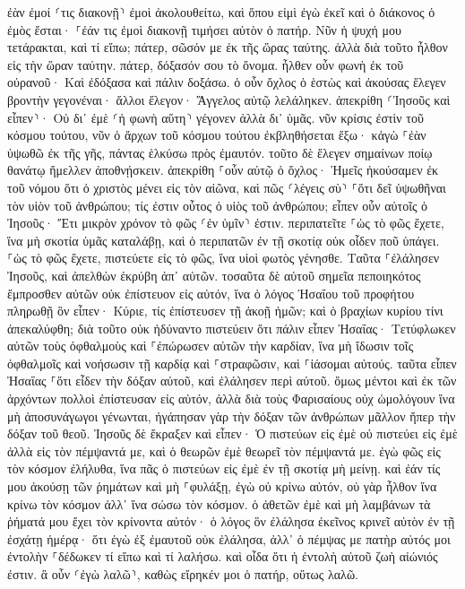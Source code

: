 \documentclass[twoside, 9pt]{extreport}
\begin{document}
ἐὰν ἐμοί ⸂τις διακονῇ⸃ ἐμοὶ ἀκολουθείτω, καὶ ὅπου εἰμὶ ἐγὼ ἐκεῖ καὶ ὁ διάκονος ὁ ἐμὸς ἔσται· ⸀ἐάν τις ἐμοὶ διακονῇ τιμήσει αὐτὸν ὁ πατήρ. 
Νῦν ἡ ψυχή μου τετάρακται, καὶ τί εἴπω; πάτερ, σῶσόν με ἐκ τῆς ὥρας ταύτης. ἀλλὰ διὰ τοῦτο ἦλθον εἰς τὴν ὥραν ταύτην. 
πάτερ, δόξασόν σου τὸ ὄνομα. ἦλθεν οὖν φωνὴ ἐκ τοῦ οὐρανοῦ· Καὶ ἐδόξασα καὶ πάλιν δοξάσω. 
ὁ οὖν ὄχλος ὁ ἑστὼς καὶ ἀκούσας ἔλεγεν βροντὴν γεγονέναι· ἄλλοι ἔλεγον· Ἄγγελος αὐτῷ λελάληκεν. 
ἀπεκρίθη ⸂Ἰησοῦς καὶ εἶπεν⸃· Οὐ δι᾽ ἐμὲ ⸂ἡ φωνὴ αὕτη⸃ γέγονεν ἀλλὰ δι᾽ ὑμᾶς. 
νῦν κρίσις ἐστὶν τοῦ κόσμου τούτου, νῦν ὁ ἄρχων τοῦ κόσμου τούτου ἐκβληθήσεται ἔξω· 
κἀγὼ ⸀ἐὰν ὑψωθῶ ἐκ τῆς γῆς, πάντας ἑλκύσω πρὸς ἐμαυτόν. 
τοῦτο δὲ ἔλεγεν σημαίνων ποίῳ θανάτῳ ἤμελλεν ἀποθνῄσκειν. 
ἀπεκρίθη ⸀οὖν αὐτῷ ὁ ὄχλος· Ἡμεῖς ἠκούσαμεν ἐκ τοῦ νόμου ὅτι ὁ χριστὸς μένει εἰς τὸν αἰῶνα, καὶ πῶς ⸂λέγεις σὺ⸃ ⸀ὅτι δεῖ ὑψωθῆναι τὸν υἱὸν τοῦ ἀνθρώπου; τίς ἐστιν οὗτος ὁ υἱὸς τοῦ ἀνθρώπου; 
εἶπεν οὖν αὐτοῖς ὁ Ἰησοῦς· Ἔτι μικρὸν χρόνον τὸ φῶς ⸂ἐν ὑμῖν⸃ ἐστιν. περιπατεῖτε ⸀ὡς τὸ φῶς ἔχετε, ἵνα μὴ σκοτία ὑμᾶς καταλάβῃ, καὶ ὁ περιπατῶν ἐν τῇ σκοτίᾳ οὐκ οἶδεν ποῦ ὑπάγει. 
⸀ὡς τὸ φῶς ἔχετε, πιστεύετε εἰς τὸ φῶς, ἵνα υἱοὶ φωτὸς γένησθε. Ταῦτα ⸀ἐλάλησεν Ἰησοῦς, καὶ ἀπελθὼν ἐκρύβη ἀπ᾽ αὐτῶν. 
τοσαῦτα δὲ αὐτοῦ σημεῖα πεποιηκότος ἔμπροσθεν αὐτῶν οὐκ ἐπίστευον εἰς αὐτόν, 
ἵνα ὁ λόγος Ἠσαΐου τοῦ προφήτου πληρωθῇ ὃν εἶπεν· Κύριε, τίς ἐπίστευσεν τῇ ἀκοῇ ἡμῶν; καὶ ὁ βραχίων κυρίου τίνι ἀπεκαλύφθη; 
διὰ τοῦτο οὐκ ἠδύναντο πιστεύειν ὅτι πάλιν εἶπεν Ἠσαΐας· 
Τετύφλωκεν αὐτῶν τοὺς ὀφθαλμοὺς καὶ ⸀ἐπώρωσεν αὐτῶν τὴν καρδίαν, ἵνα μὴ ἴδωσιν τοῖς ὀφθαλμοῖς καὶ νοήσωσιν τῇ καρδίᾳ καὶ ⸀στραφῶσιν, καὶ ⸀ἰάσομαι αὐτούς. 
ταῦτα εἶπεν Ἠσαΐας ⸀ὅτι εἶδεν τὴν δόξαν αὐτοῦ, καὶ ἐλάλησεν περὶ αὐτοῦ. 
ὅμως μέντοι καὶ ἐκ τῶν ἀρχόντων πολλοὶ ἐπίστευσαν εἰς αὐτόν, ἀλλὰ διὰ τοὺς Φαρισαίους οὐχ ὡμολόγουν ἵνα μὴ ἀποσυνάγωγοι γένωνται, 
ἠγάπησαν γὰρ τὴν δόξαν τῶν ἀνθρώπων μᾶλλον ἤπερ τὴν δόξαν τοῦ θεοῦ. 
Ἰησοῦς δὲ ἔκραξεν καὶ εἶπεν· Ὁ πιστεύων εἰς ἐμὲ οὐ πιστεύει εἰς ἐμὲ ἀλλὰ εἰς τὸν πέμψαντά με, 
καὶ ὁ θεωρῶν ἐμὲ θεωρεῖ τὸν πέμψαντά με. 
ἐγὼ φῶς εἰς τὸν κόσμον ἐλήλυθα, ἵνα πᾶς ὁ πιστεύων εἰς ἐμὲ ἐν τῇ σκοτίᾳ μὴ μείνῃ. 
καὶ ἐάν τίς μου ἀκούσῃ τῶν ῥημάτων καὶ μὴ ⸀φυλάξῃ, ἐγὼ οὐ κρίνω αὐτόν, οὐ γὰρ ἦλθον ἵνα κρίνω τὸν κόσμον ἀλλ᾽ ἵνα σώσω τὸν κόσμον. 
ὁ ἀθετῶν ἐμὲ καὶ μὴ λαμβάνων τὰ ῥήματά μου ἔχει τὸν κρίνοντα αὐτόν· ὁ λόγος ὃν ἐλάλησα ἐκεῖνος κρινεῖ αὐτὸν ἐν τῇ ἐσχάτῃ ἡμέρᾳ· 
ὅτι ἐγὼ ἐξ ἐμαυτοῦ οὐκ ἐλάλησα, ἀλλ᾽ ὁ πέμψας με πατὴρ αὐτός μοι ἐντολὴν ⸀δέδωκεν τί εἴπω καὶ τί λαλήσω. 
καὶ οἶδα ὅτι ἡ ἐντολὴ αὐτοῦ ζωὴ αἰώνιός ἐστιν. ἃ οὖν ⸂ἐγὼ λαλῶ⸃, καθὼς εἴρηκέν μοι ὁ πατήρ, οὕτως λαλῶ. 
\end{document}

